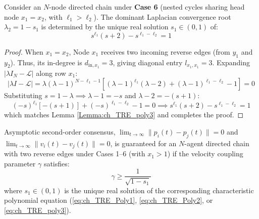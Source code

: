 \begin{theo}\label{theo10}
Consider an $N$-node directed chain under \textbf{Case 6} (nested cycles sharing head node $x_1 = x_2$, with $\ell_1 > \ell_2$). The dominant Laplacian convergence root $\lambda_2 = 1 - s_1$ is determined by the unique real solution $s_1 \in (0,1)$ of:
\begin{equation}\label{eq:case6_statement}
	s^{\ell_1}(s+2) - s^{\ell_1-\ell_2} = 1
\end{equation}
\end{theo}

\begin{proof}
When $x_1 = x_2$, Node $x_1$ receives two incoming reverse edges (from $y_1$ and $y_2$). Thus, its in-degree is $d_{\text{in}, x_1} = 3$, giving diagonal entry $l_{x_1, x_1} = 3$. Expanding $|\lambda I_N - \mathcal{L}|$ along row $x_1$:
\begin{equation}
	|\lambda I - \mathcal{L}| = \lambda (\lambda-1)^{N-\ell_1-1} \left[ (\lambda-1)^{\ell_1}(\lambda-2) + (\lambda-1)^{\ell_1-\ell_2} - 1 \right] = 0
\end{equation}
Substituting $s = 1 - \lambda \implies \lambda - 1 = -s$ and $\lambda - 2 = -(s+1)$:
\begin{equation}
	(-s)^{\ell_1}[-(s+1)] + (-s)^{\ell_1-\ell_2} - 1 = 0 \implies s^{\ell_1}(s+2) - s^{\ell_1-\ell_2} = 1
\end{equation}
which matches Lemma \ref{Lemma:ch_TRE_poly3} and completes the proof.
\end{proof}









\begin{theo}\label{theo11}
\leavevmode\par\noindent
Asymptotic second-order consensus, $\lim_{t \to \infty} \|p_i(t) - p_j(t)\| = 0$ and $\lim_{t \to \infty} \|v_i(t) - v_j(t)\| = 0$, is guaranteed for an $N$-agent directed chain with two reverse edges under Cases 1–6 (with $x_1 > 1$) if the velocity coupling parameter $\gamma$ satisfies:
\begin{equation}\label{new-sufficiency}
	\gamma \ge \frac{1}{\sqrt{1 - s_1}}
\end{equation}
where $s_1 \in (0,1)$ is the unique real solution of the corresponding characteristic polynomial equation (\eqref{eq:ch_TRE_Poly1}, \eqref{eq:ch_TRE_Poly2}, or \eqref{eq:ch_TRE_poly3}).
\end{theo}

